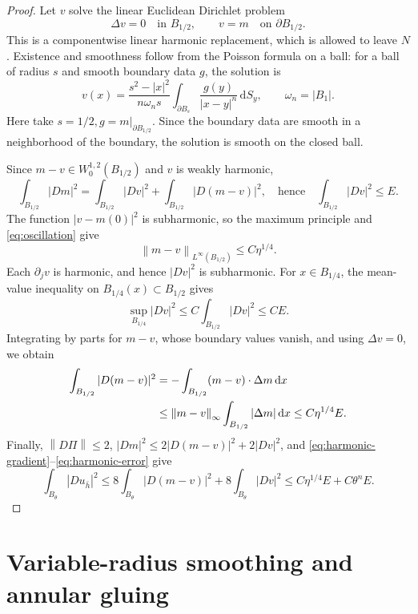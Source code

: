 \documentclass[11pt,a4paper]{article}
\numberwithin{equation}{section}
\theoremstyle{definition}
\newcommand{\dd}{\,\mathrm d}
\newcommand{\dx}{\dd x}
\newcommand{\Wo}{W^{1,2}_0}
\newcommand{\norm}[1]{\left\lVert #1\right\rVert}
\begin{document}
\begin{proof}
Let $v$ solve the linear Euclidean Dirichlet problem
\[
\Delta v=0\quad\text{in }B_{1/2},\qquad v=m\quad\text{on }\partial B_{1/2}.
\]
This is a componentwise linear harmonic replacement, which is allowed to leave $N$. Existence and smoothness follow from the Poisson formula on a ball: for a ball of radius $s$ and smooth boundary data $g$, the solution is
\[
v(x)=\frac{s^2-|x|^2}{n\omega_n s}
\int_{\partial B_s}\frac{g(y)}{|x-y|^n}\dd S_y,
\qquad \omega_n=|B_1|.
\]
Here take $s=1/2,g=m|_{\partial B_{1/2}}$. Since the boundary data are smooth in a neighborhood of the boundary, the solution is smooth on the closed ball.

Since $m-v\in\Wo(B_{1/2})$ and $v$ is weakly harmonic,
\[
\int_{B_{1/2}}|Dm|^2
=\int_{B_{1/2}}|Dv|^2+\int_{B_{1/2}}|D(m-v)|^2,
\quad\text{hence}\quad \int_{B_{1/2}}|Dv|^2\le E.
\]
The function $|v-m(0)|^2$ is subharmonic, so the maximum principle and \eqref{eq:oscillation} give
\begin{equation}\label{eq:harmonic-difference}
\norm{m-v}_{L^\infty(B_{1/2})}\le C\eta^{1/4}.
\end{equation}
Each $\partial_jv$ is harmonic, and hence $|Dv|^2$ is subharmonic. For $x\in B_{1/4}$, the mean-value inequality on $B_{1/4}(x)\subset B_{1/2}$ gives
\begin{equation}\label{eq:harmonic-gradient}
\sup_{B_{1/4}}|Dv|^2\le C\int_{B_{1/2}}|Dv|^2\le CE.
\end{equation}
Integrating by parts for $m-v$, whose boundary values vanish, and using $\Delta v=0$, we obtain
\begin{align}
\int_{B_{1/2}}|D(m-v)|^2
&=-\int_{B_{1/2}}(m-v)\cdot\Delta m\dx\notag\\
&\le\norm{m-v}_\infty\int_{B_{1/2}}|\Delta m|\dx
\le C\eta^{1/4}E.\label{eq:harmonic-error}
\end{align}
Finally, $\norm{D\Pi}\le2$, $|Dm|^2\le2|D(m-v)|^2+2|Dv|^2$, and \eqref{eq:harmonic-gradient}--\eqref{eq:harmonic-error} give
\[
\int_{B_\theta}|Du_{\bar h}|^2
\le8\int_{B_\theta}|D(m-v)|^2+8\int_{B_\theta}|Dv|^2
\le C\eta^{1/4}E+C\theta^nE.
\]
\end{proof}

\section{Variable-radius smoothing and annular gluing}\label{sec:gluing}
\end{document}

